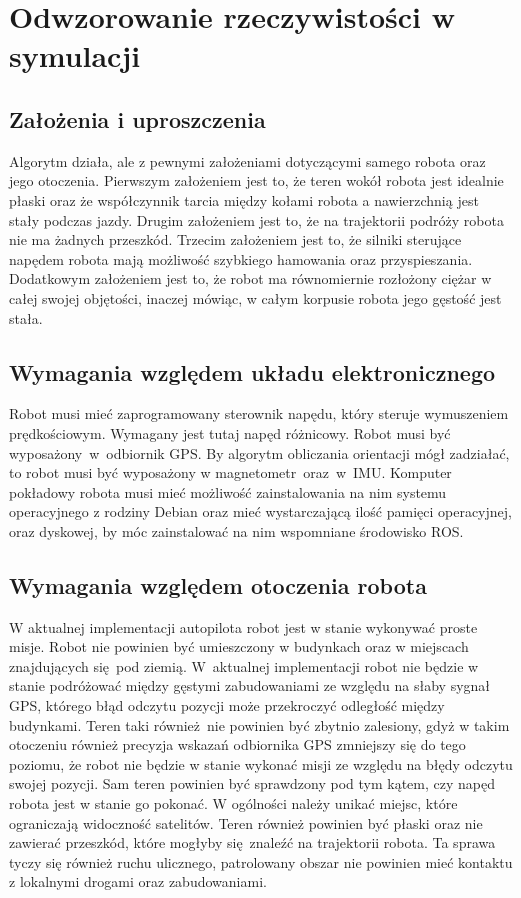 \newpage
\section{Odwzorowanie rzeczywistości w symulacji}
{

    \subsection{Założenia i uproszczenia}
    {
        Algorytm działa, ale z pewnymi założeniami dotyczącymi samego robota oraz jego otoczenia. Pierwszym założeniem jest to, że teren wokół robota jest idealnie płaski oraz że współczynnik tarcia między kołami robota a nawierzchnią jest stały podczas jazdy. Drugim założeniem jest to, że na trajektorii podróży robota nie ma żadnych przeszkód. Trzecim założeniem jest to, że silniki sterujące napędem robota mają możliwość szybkiego hamowania oraz przyspieszania. Dodatkowym założeniem jest to, że robot ma równomiernie rozłożony ciężar w całej swojej objętości, inaczej mówiąc, w całym korpusie robota jego gęstość jest stała.
    }
    \subsection{Wymagania względem układu elektronicznego}
    {
         Robot musi mieć zaprogramowany sterownik napędu, który steruje wymuszeniem prędkościowym. Wymagany jest tutaj napęd różnicowy. Robot musi być wyposażony~w~odbiornik GPS. By algorytm obliczania orientacji mógł zadziałać, to robot musi być wyposażony w magnetometr~oraz~w~IMU. Komputer pokładowy robota musi mieć możliwość zainstalowania na nim systemu operacyjnego z rodziny Debian oraz mieć wystarczającą ilość pamięci operacyjnej, oraz dyskowej, by móc zainstalować na nim wspomniane środowisko ROS.
    }
    \subsection{Wymagania względem otoczenia robota}
    {
        W aktualnej implementacji autopilota robot jest w stanie wykonywać proste misje. Robot nie powinien być umieszczony w budynkach oraz w miejscach znajdujących się pod ziemią. W~aktualnej implementacji robot nie będzie w stanie podróżować między gęstymi zabudowaniami ze względu na słaby sygnał GPS, którego błąd odczytu pozycji może przekroczyć odległość między budynkami. Teren taki również nie powinien być zbytnio zalesiony, gdyż w takim otoczeniu również precyzja wskazań odbiornika GPS zmniejszy się do tego poziomu, że robot nie będzie w stanie wykonać misji ze względu na błędy odczytu swojej pozycji. Sam teren powinien być sprawdzony pod tym kątem, czy napęd robota jest w stanie go pokonać. W ogólności należy unikać miejsc, które ograniczają widoczność satelitów. Teren również powinien być płaski oraz nie zawierać przeszkód, które mogłyby się znaleźć na trajektorii robota. Ta sprawa tyczy się również ruchu ulicznego, patrolowany obszar nie powinien mieć kontaktu z lokalnymi drogami oraz zabudowaniami. 
    }
}